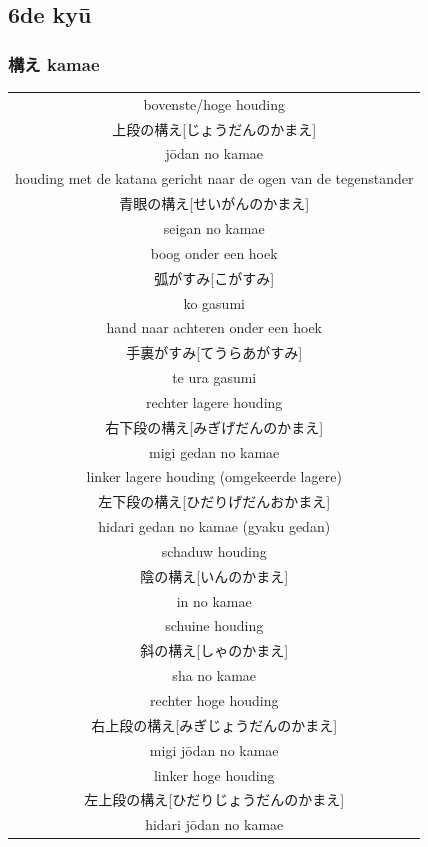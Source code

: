 \documentclass[12pt]{scrartcl}
\begin{document}
\begin{CJK*}{UTF8}{min}
\subsection{6de ky\={u}}
\subsubsection{構え kamae}
\begin{table}[H]
\begin{center}
\begin{tabular}{c}
bovenste/hoge houding\\
上段の構え[じょうだんのかまえ]\\
j\={o}dan no kamae\\
\hline
houding met de katana gericht naar de ogen van de tegenstander\\
青眼の構え[せいがんのかまえ]\\
seigan no kamae\\
\hline
boog onder een hoek\\
弧がすみ[こがすみ]\\
ko gasumi\\
\hline
hand naar achteren onder een hoek\\
手裏がすみ[てうらあがすみ]\\
te ura gasumi\\
\hline
rechter lagere houding\\
右下段の構え[みぎげだんのかまえ]\\
migi gedan no kamae\\
\hline
linker lagere houding (omgekeerde lagere)\\
左下段の構え[ひだりげだんおかまえ]\\
hidari gedan no kamae (gyaku gedan)\\
\hline
schaduw houding\\
陰の構え[いんのかまえ]\\
in no kamae\\
\hline
schuine houding\\
斜の構え[しゃのかまえ]\\
sha no kamae\\
\hline
rechter hoge houding\\
右上段の構え[みぎじょうだんのかまえ]\\
migi j\={o}dan no kamae\\
\hline
linker hoge houding\\
左上段の構え[ひだりじょうだんのかまえ]\\
hidari j\={o}dan no kamae\\

\end{tabular}
\end{center}
\end{table}
\end{CJK*}
\end{document}
